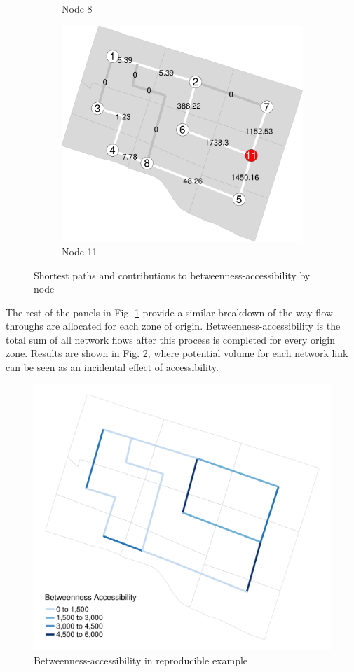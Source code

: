 \documentclass[]{elsarticle} %
\begin{document}
\begin{figure}
\begin{subfigure}{0.32\textwidth}
  \caption{Node 8}
\end{subfigure}
\begin{subfigure}{0.32\textwidth}
  \centering
  \includegraphics[width=1\linewidth]{Plots/sp11.pdf}  
  \caption{Node 11}
\end{subfigure}
\caption{Shortest paths and contributions to betweenness-accessibility by node}
  \label{shortest-paths-example}
\end{figure}

The rest of the panels in Fig. \ref{shortest-paths-example} provide a
similar breakdown of the way flow-throughs are allocated for each zone
of origin. Betweenness-accessibility is the total sum of all network
flows after this process is completed for every origin zone. Results are
shown in Fig. \ref{btw-accessibility-reproducible-example}, where
potential volume for each network link can be seen as an incidental
effect of accessibility.

\begin{figure}
  \centering
  \includegraphics[width=0.8\linewidth]{Plots/map_btw.pdf}  
  \caption{Betweenness-accessibility in reproducible example}
  \label{btw-accessibility-reproducible-example}
\end{figure}
\end{document}
